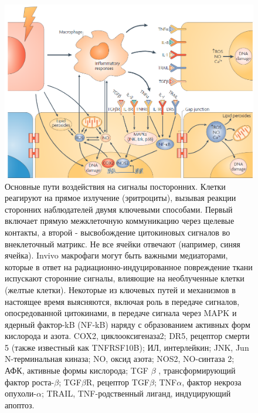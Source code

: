 \documentclass[11pt]{article}
\begin{document}
\begin{figure}[!htpb]
\centering
\includegraphics[scale=0.5]{ribe}
\caption{Основные пути воздействия на сигналы посторонних. Клетки реагируют на прямое излучение (эритроциты), вызывая реакции сторонних наблюдателей двумя ключевыми способами. Первый включает прямую межклеточную коммуникацию через щелевые контакты, а второй - высвобождение цитокиновых сигналов во внеклеточный матрикс. Не все ячейки отвечают (например, синяя ячейка). Invivo макрофаги могут быть важными медиаторами, которые в ответ на радиационно-индуцированное повреждение ткани испускают сторонние сигналы, влияющие на необлученные клетки (желтые клетки). Некоторые из ключевых путей и механизмов в настоящее время выясняются, включая роль в передаче сигналов, опосредованной цитокинами, в передаче сигнала через MAPK и ядерный фактор-kB (NF-kB) наряду с образованием активных форм кислорода и азота. COX2, циклооксигеназа2; DR5, рецептор смерти 5 (также известный как TNFRSF10B); ИЛ, интерлейкин; JNK, Jun N-терминальная киназа; NO, оксид азота; NOS2, NO-синтаза 2; АФК, активные формы кислорода; TGF $\beta$ , трансформирующий фактор роста-$\beta$; TGF$\beta$R, рецептор TGF$\beta$; TNF$\alpha$, фактор некроза опухоли-$\alpha$; TRAIL, TNF-родственный лиганд, индуцирующий апоптоз. ~\cite{Prise}}
\label{}
\end{figure}
\end{document}
